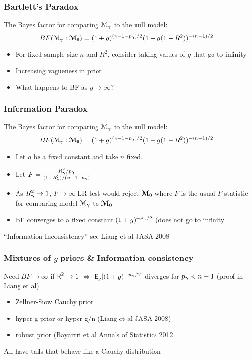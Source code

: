 \documentclass[]{beamer}
\begin{document}
\begin{frame}
  \frametitle{Bartlett's Paradox}

The Bayes factor for comparing ${\cal M}_\gamma$ to the null
model:
$$
 BF({\cal M}_\gamma : \boldsymbol{{\cal M}}_0) =    (1 + g)^{(n - 1 - p_{\boldsymbol{\gamma}})/2} (1 + g(1 - R^2))^{-(n-1)/2}
$$
\pause
\begin{itemize}
\item For fixed sample size $n$ and $R^2$, consider taking values of  $g$ that
  go to infinity  \pause
\item Increasing vagueness in prior \pause
\item What happens to BF as $g \to \infty$?

\end{itemize}





\end{frame}

\begin{frame}
  \frametitle{Information Paradox}

The Bayes factor for comparing ${\cal M}_\gamma$ to the null
model:
$$
 BF({\cal M}_\gamma : \boldsymbol{{\cal M}}_0) =    (1 + g)^{(n - 1 - p_{\boldsymbol{\gamma}})/2} (1 + g(1 - R^2))^{-(n-1)/2}
$$
\pause
\begin{itemize}
\item Let $g$ be a fixed constant and take $n$ fixed. \pause
\item Let $F = \frac{R_{\boldsymbol{\gamma}}^2/p_{\boldsymbol{\gamma}}}{(1 - R_{\boldsymbol{\gamma}}^2)/(n - 1 - p_{\boldsymbol{\gamma}})}$ \pause
\item As $R^2_{\boldsymbol{\gamma}} \to 1$, $F \to \infty$ LR test would reject $\boldsymbol{{\cal M}}_0$
  where $F$ is the usual $F$ statistic for  comparing model ${\cal M}_\gamma$ to
  $\boldsymbol{{\cal M}}_0$ \pause
\item BF converges to a fixed constant $(1+g)^{-p_{\boldsymbol{\gamma}}/2}$  (does not go
  to infinity
\end{itemize}

``Information Inconsistency''  see Liang et al JASA 2008


\end{frame}


\begin{frame}
  \frametitle{Mixtures of $g$ priors \& Information consistency}

Need $BF \to \infty$ if $\textsf{R}^2 \to 1$  $\Leftrightarrow$ $\textsf{E}_g[(1 +
g)^{-p_{\boldsymbol{\gamma}}/2}]$ diverges for $p_{\boldsymbol{\gamma}} < n - 1$ (proof in Liang et al)
\pause
\begin{itemize}
\item Zellner-Siow Cauchy prior \pause
\item hyper-g prior or hyper-g/n (Liang et al JASA 2008) \pause
\item robust prior (Bayarrri et al Annals of Statistics 2012 \pause
\end{itemize}

 All have tails that behave like a Cauchy distribution
\end{frame}
\end{document}
